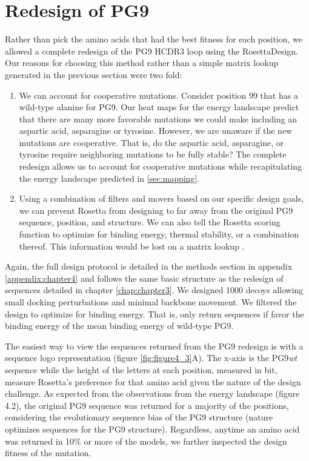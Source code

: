 \section{Redesign of PG9}
Rather than pick the amino acids that had the best fitness for each position, we allowed a complete redesign of the PG9 HCDR3 loop using the RosettaDesign. Our reasons for choosing this method rather than a simple matrix lookup generated in the previous section were two fold:
\begin{enumerate}
\item We can account for cooperative mutations. Consider position 99 that has a wild-type alanine for PG9. Our heat maps for the energy landscape predict that there are many more favorable mutations we could make including an aspartic acid, asparagine or tyrosine. However, we are unaware if the new mutations are cooperative. That is, do the aspartic acid, asparagine, or tyrosine require neighboring mutations to be fully stable? The complete redesign allows us to account for cooperative mutations while recapitulating the energy landscape predicted in \ref{sec:mapping}. 
\item Using a combination of filters and movers based on our specific design goals, we can prevent Rosetta from designing to far away from the original PG9 sequence, position, and structure. We can also tell the Rosetta scoring function to optimize for binding energy, thermal stability, or a combination thereof. This information would be lost on a matrix lookup \citep{Fleishman:2011ji,Kaufmann:2010ea,Kuhlman:2000tc}.
\end{enumerate}

Again, the full design protocol is detailed in the methods section in appendix \ref{appendix:chapter4} and follows the same basic structure as the redesign of sequences detailed in chapter \ref{chap:chapter3}. We designed 1000 decoys allowing small docking perturbations and minimal backbone movement. We filtered the design to optimize for binding energy. That is, only return sequences if favor the binding energy of the mean binding energy of wild-type PG9. 

The easiest way to view the sequences returned from the PG9 redesign is with a sequence logo representation (figure \ref{fig:figure4_3}A). The x-axis is the PG9\textit{wt} sequence while the height of the letters at each position, measured in bit, measure Rosetta's preference for that amino acid given the nature of the design challenge. As expected from the observations from the energy landscape (figure 4.2), the original PG9 sequence was returned for a majority of the positions, considering the evolutionary sequence bias of the PG9 structure (nature optimizes sequences for the PG9 structure).  Regardless, anytime an amino acid was returned in 10\% or more of the models, we further inspected the design fitness of the mutation.

